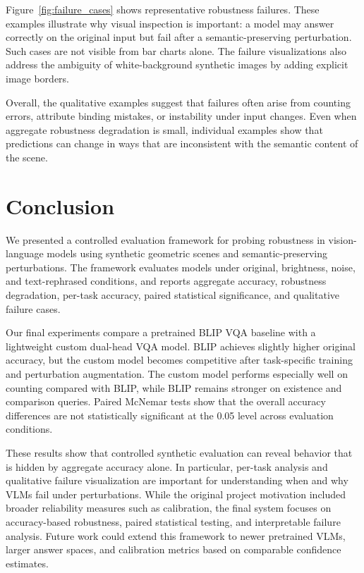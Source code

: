 Figure~\ref{fig:failure_cases} shows representative robustness failures. These examples illustrate why visual inspection is important: a model may answer correctly on the original input but fail after a semantic-preserving perturbation. Such cases are not visible from bar charts alone. The failure visualizations also address the ambiguity of white-background synthetic images by adding explicit image borders.

Overall, the qualitative examples suggest that failures often arise from counting errors, attribute binding mistakes, or instability under input changes. Even when aggregate robustness degradation is small, individual examples show that predictions can change in ways that are inconsistent with the semantic content of the scene.

\section{Conclusion}

We presented a controlled evaluation framework for probing robustness in vision-language models using synthetic geometric scenes and semantic-preserving perturbations. The framework evaluates models under original, brightness, noise, and text-rephrased conditions, and reports aggregate accuracy, robustness degradation, per-task accuracy, paired statistical significance, and qualitative failure cases.

Our final experiments compare a pretrained BLIP VQA baseline with a lightweight custom dual-head VQA model. BLIP achieves slightly higher original accuracy, but the custom model becomes competitive after task-specific training and perturbation augmentation. The custom model performs especially well on counting compared with BLIP, while BLIP remains stronger on existence and comparison queries. Paired McNemar tests show that the overall accuracy differences are not statistically significant at the 0.05 level across evaluation conditions.

These results show that controlled synthetic evaluation can reveal behavior that is hidden by aggregate accuracy alone. In particular, per-task analysis and qualitative failure visualization are important for understanding when and why VLMs fail under perturbations. While the original project motivation included broader reliability measures such as calibration, the final system focuses on accuracy-based robustness, paired statistical testing, and interpretable failure analysis. Future work could extend this framework to newer pretrained VLMs, larger answer spaces, and calibration metrics based on comparable confidence estimates.

